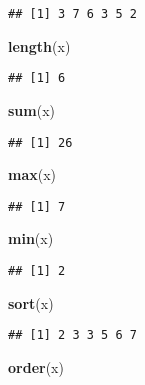 \documentclass[
  a4paper,
]{article}
\newenvironment{Shaded}{\begin{snugshade}}{\end{snugshade}}
\newcommand{\FunctionTok}[1]{\textcolor[rgb]{0.13,0.29,0.53}{\textbf{#1}}}
\newcommand{\NormalTok}[1]{#1}
\begin{document}
\begin{verbatim}
## [1] 3 7 6 3 5 2
\end{verbatim}

\begin{Shaded}
\begin{Highlighting}[]
\FunctionTok{length}\NormalTok{(x)}
\end{Highlighting}
\end{Shaded}

\begin{verbatim}
## [1] 6
\end{verbatim}

\begin{Shaded}
\begin{Highlighting}[]
\FunctionTok{sum}\NormalTok{(x)}
\end{Highlighting}
\end{Shaded}

\begin{verbatim}
## [1] 26
\end{verbatim}

\begin{Shaded}
\begin{Highlighting}[]
\FunctionTok{max}\NormalTok{(x)}
\end{Highlighting}
\end{Shaded}

\begin{verbatim}
## [1] 7
\end{verbatim}

\begin{Shaded}
\begin{Highlighting}[]
\FunctionTok{min}\NormalTok{(x)}
\end{Highlighting}
\end{Shaded}

\begin{verbatim}
## [1] 2
\end{verbatim}

\begin{Shaded}
\begin{Highlighting}[]
\FunctionTok{sort}\NormalTok{(x)}
\end{Highlighting}
\end{Shaded}

\begin{verbatim}
## [1] 2 3 3 5 6 7
\end{verbatim}

\begin{Shaded}
\begin{Highlighting}[]
\FunctionTok{order}\NormalTok{(x)}
\end{Highlighting}
\end{Shaded}
\end{document}
